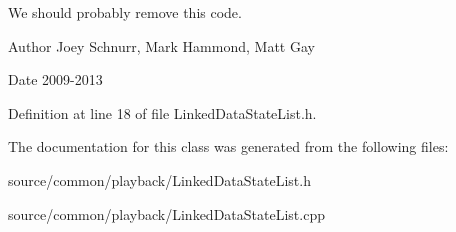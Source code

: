 We should probably remove this code. \begin{DoxyAuthor}{Author}
Joey Schnurr, Mark Hammond, Matt Gay 
\end{DoxyAuthor}
\begin{DoxyDate}{Date}
2009-\/2013 
\end{DoxyDate}


Definition at line 18 of file Linked\-Data\-State\-List.\-h.



The documentation for this class was generated from the following files\-:\begin{DoxyCompactItemize}
\item 
source/common/playback/Linked\-Data\-State\-List.\-h\item 
source/common/playback/Linked\-Data\-State\-List.\-cpp\end{DoxyCompactItemize}
